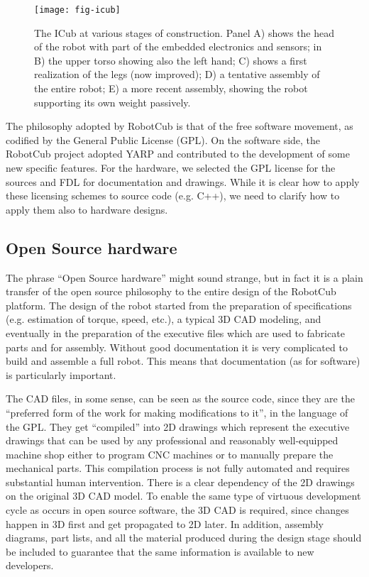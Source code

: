 \begin{figure}[tbp]
\centerline{
\texttt{[image: fig-icub]}
}
\caption{The ICub at various stages of construction. Panel A) shows the head
of the robot with part of the embedded electronics and sensors; in B) the upper
torso showing also the left hand; C) shows a first realization of the legs (now
improved); D) a tentative assembly of the entire robot; 
E) a more recent assembly, showing the robot supporting its own weight
passively.
} 
\label{fig:icub}
\end{figure}


The philosophy adopted by RobotCub is that of
the free software movement,
as codified by the General Public License (GPL). 
On the software side, the RobotCub project adopted YARP and contributed
to the development of some new specific features. For the hardware, we
selected the GPL license for the sources and FDL for documentation
and drawings. While it is clear how to apply these licensing
schemes to source code (e.g. C++), we need to clarify how to
apply them also to hardware designs.

\subsection{Open Source hardware}
The phrase ``Open Source hardware'' might sound strange,
 but in fact it is a 
plain transfer of the open source philosophy to the entire
design of the RobotCub platform.
%
%
The design of the robot started from 
the preparation of specifications (e.g. estimation of torque, speed, etc.),
a typical 3D CAD modeling, and eventually in the preparation
of the executive files which are used to fabricate parts and for assembly. 
Without good documentation it is very complicated to build and assemble 
a full robot. This means that documentation (as for software) is particularly 
important.

The CAD files, in some sense, can be seen as the source code, since
they are the ``preferred form of the work for making modifications
to it'', in the language of the GPL.
%
They get ``compiled''
into 2D drawings which represent the executive drawings that can be used by any
professional and reasonably well-equipped machine shop either to program CNC machines 
or to manually prepare the mechanical parts. This compilation process is not fully 
automated and requires substantial human intervention. There is a clear dependency 
of the 2D drawings on the original 3D CAD model. To enable the same type of virtuous 
development cycle as occurs in open source software, the 3D CAD is required, since changes happen 
in 3D first and get propagated to 2D later. In addition, assembly diagrams, part 
lists, and all the material produced during the design stage should be included 
to guarantee that the same information is available to new developers.


